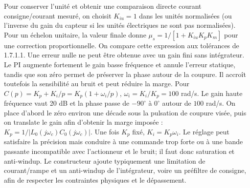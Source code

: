 \begin{corrigebox}
Pour conserver l'unité et obtenir une comparaison directe courant
            consigne/courant mesuré, on choisit $K_{iu}=1$ dans les unités normalisées (ou
            l'inverse du gain du capteur si les unités électriques ne sont pas normalisées).
Pour un échelon unitaire, la valeur finale donne
            $\mu_s=1/[1+K_{iu}K_pK_m]$ pour une correction proportionnelle.
On compare cette expression aux tolérances de 1.7.1.1. Une erreur nulle ne
            peut être obtenue avec un gain fini sans intégrateur.
Le PI augmente fortement le gain basse fréquence et annule l'erreur
            statique, tandis que son zéro permet de préserver la phase autour de la
            coupure. Il accroît toutefois la sensibilité au bruit et peut réduire la marge.
Pour $C(p)=K_p+K_i/p=K_p(1+\omega_i/p)$,
            $\omega_i=K_i/K_p=100$ rad/s. Le gain haute fréquence vaut 20 dB et la phase
            passe de $-90^\circ$ à $0^\circ$ autour de $100$ rad/s.
On place d'abord le zéro environ une décade sous la pulsation de coupure
            visée, puis on translate le gain afin d'obtenir la marge imposée :
            $K_p=1/|L_0(j\omega_c)C_0(j\omega_c)|$.
Une fois $K_p$ fixé, $K_i=K_p\omega_i$.
Le réglage peut satisfaire la précision mais conduire à une commande trop
            forte ou à une bande passante incompatible avec l'actionneur et le bruit; il
            faut donc saturation et anti-windup.
Le constructeur ajoute typiquement une limitation de courant/rampe et un
            anti-windup de l'intégrateur, voire un préfiltre de consigne, afin de respecter
            les contraintes physiques et le dépassement.
\end{corrigebox}
